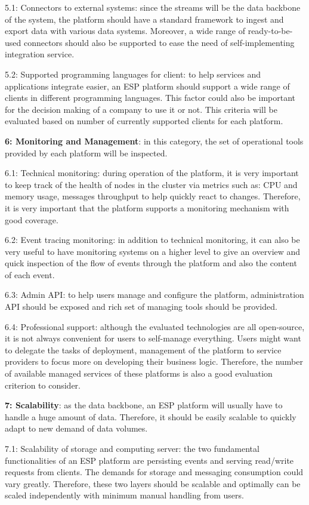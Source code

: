 5.1: Connectors to external systems: since the streams will be the data backbone of the system, the platform should have a standard framework to ingest and export data with various data systems. Moreover, a wide range of ready-to-be-used connectors should also be supported to ease the need of self-implementing integration service.

5.2: Supported programming languages for client: to help services and applications integrate easier, an ESP platform should support a wide range of clients in different programming languages. This factor could also be important for the decision making of a company to use it or not. This criteria will be evaluated based on number of currently supported clients for each platform.

\textbf{6: Monitoring and Management}: in this category, the set of operational tools provided by each platform will be inspected. 

6.1: Technical monitoring: during operation of the platform, it is very important to keep track of the health of nodes in the cluster via metrics such as: CPU and memory usage, messages throughput to help quickly react to changes. Therefore, it is very important that the platform supports a monitoring mechanism with good coverage.

6.2: Event tracing monitoring: in addition to technical monitoring, it can also be very useful to have monitoring systems on a higher level to give an overview and quick inspection of the flow of events through the platform and also the content of each event.

6.3: Admin API: to help users manage and configure the platform, administration API should be exposed and rich set of managing tools should be provided. 

6.4: Professional support: although the evaluated technologies are all open-source, it is not always convenient for users to self-manage everything. Users might want to delegate the tasks of deployment, management of the platform to service providers to focus more on developing their business logic. Therefore, the number of available managed services of these platforms is also a good evaluation criterion to consider.


\textbf{7: Scalability}: as the data backbone, an ESP platform will usually have to handle a huge amount of data. Therefore, it should be easily scalable to quickly adapt to new demand of data volumes.

7.1: Scalability of storage and computing server: the two fundamental functionalities of an ESP platform are persisting events and serving read/write requests from clients. The demands for storage and messaging consumption could vary greatly. Therefore, these two layers should be scalable and optimally can be scaled independently with minimum manual handling from users.

